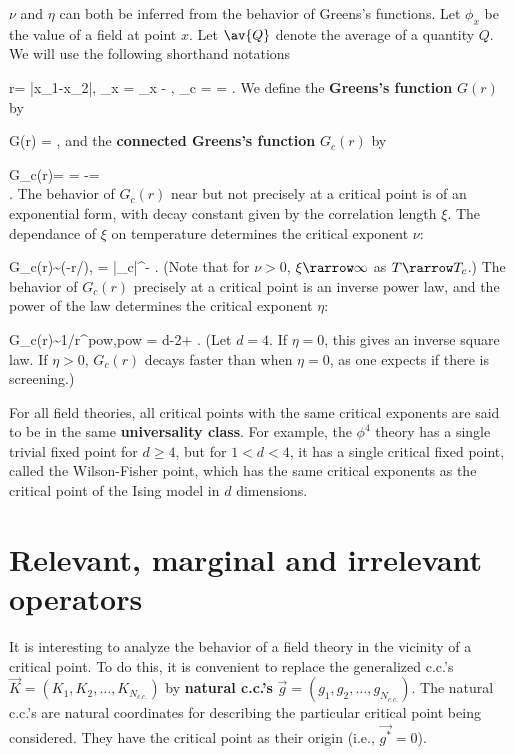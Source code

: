 $\nu$ and $\eta$
can both be inferred
from the behavior of Greens's functions.
Let $\phi_x$ be the value of
a field at point $x$. Let
$\av{Q}$
denote the average of a
quantity $Q$. We will use the
following shorthand notations

\beq
r= |x_1-x_2|,\;\;
\Delta\phi_x = \phi_x - ,\;\;
\theta_c = =
\;.
\eeq
We define the {\bf Greens's function} $G(r)$
by

\beq
G(r) = 
\;,
\eeq
and the \textbf{connected Greens's function}
 $G_c(r)$ by

\beq
G_c(r)=
=
-=
\\
\;.
\eeq
The behavior of $G_c(r)$ near but not precisely
at a critical point is of an
exponential form, with decay
constant given by the correlation length $\xi$.
The dependance of $\xi$ on temperature
determines the critical exponent $\nu$:

\beq
G_c(r)\sim \exp(-r/\xi),
\;\;
\xi = |\theta_c|^{-\nu}
\;.
\eeq
(Note that for $\nu>0$,
$\xi\rarrow \infty$ as $T\rarrow T_c$.)
The behavior of $G_c(r)$ precisely at
a critical point is an inverse power
law, and the power of the law
determines the critical exponent $\eta$:


\beq
G_c(r)\sim 1/r^{pow},\;\;pow = d-2+\eta
\;.
\eeq
(Let $d=4$. If $\eta=0$, this gives
an inverse square law. If $\eta>0$,
$G_c(r)$ decays faster than
when $\eta=0$,
as one expects if there is screening.)

For all
field theories, all critical points
with the same critical exponents
 are
said to be in the same
\textbf{universality class}.
For example, the $\phi^4$ theory
has a single trivial fixed point for $d\geq 4$,
but for $1<d< 4$,
it has a single critical fixed
point, called the Wilson-Fisher point,
which has the same critical exponents
as the critical point
of the Ising model in $d$ dimensions.





\section{Relevant, marginal and irrelevant operators}

It is interesting
to analyze the behavior
of a field theory in the vicinity
of a critical point.
To do this, it
is convenient to replace
the
generalized c.c.'s
$\vec{K}=(K_1, K_2,\ldots, K_{N_{c.c.}})$
by \textbf{natural c.c.'s}
$\vec{g}=(g_1, g_2,\ldots, g_{N_{c.c.}})$.
The natural c.c.'s are natural
coordinates for describing
the particular
critical point
being considered. They
have the critical point as their origin
(i.e., $\vec{g^*}=0$).

